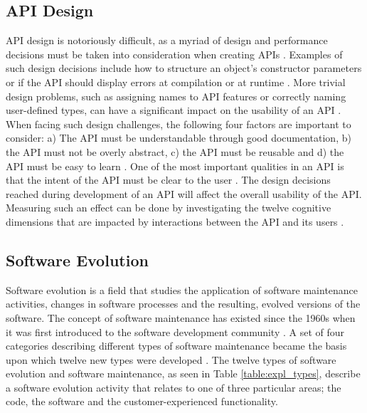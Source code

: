 \documentclass{sig-alternate}
\begin{document}
\subsection{API Design} \label{api_design}
API design is notoriously difficult, as a myriad of design and performance decisions must be taken into consideration when creating APIs \cite{afonso2012evaluating} \cite{bloch2008effective} \cite{stylos2006comparing}. Examples of such design decisions include how to structure an object's constructor parameters or if the API should display errors at compilation or at runtime \cite{stylos2006comparing}. More trivial design problems, such as assigning names to API features or correctly naming user-defined types, can have a significant impact on the usability of an API \cite{shi2011empirical}. When facing such design challenges, the following four factors are important to consider: a) The API must be understandable through good documentation, b) the API must not be overly abstract, c) the API must be reusable and d) the API must be easy to learn \cite{shi2011empirical}. One of the most important qualities in an API is that the intent of the API must be clear to the user \cite{stylos2006comparing} \cite{shi2011empirical}. The design decisions reached during development of an API will affect the overall usability of the API. Measuring such an effect can be done by investigating the twelve cognitive dimensions that are impacted by interactions between the API and its users \cite{clarke2004measuring}. 


\subsection{Software Evolution} \label{software_evolution}
Software evolution is a field that studies the application of software maintenance activities, changes in software processes and the resulting, evolved versions of the software. The concept of software maintenance has existed since the 1960s when it was first introduced to the software development community \cite{lientz1980software}. A set of four categories describing different types of software maintenance \cite{lientz1980software} became the basis upon which twelve new types were developed \cite{chapin2001types}. The twelve types of software evolution and software maintenance, as seen in Table \ref{table:expl_types}, describe a software evolution activity that relates to one of three particular areas; the code, the software and the customer-experienced functionality. 
\end{document}
